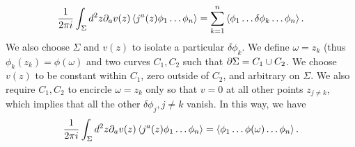 \begin{equation}
    \frac{1}{2\pi i} \int_\Sigma d^2 z \partial_a v(z)\left< j^a(z)\phi_1 \ldots \phi_n \right>=\sum_{k=1}^n \left< \phi_1 \ldots \delta \phi_k \ldots \phi_n \right>.
\end{equation}
We also choose $\Sigma$ and $v(z)$ to isolate a particular $\delta \phi_k$. We define $\omega =z_k$ (thus $\phi_k(z_k)=\phi(\omega)$ and two curves $C_1,C_2$ such that $\partial \Sigma=C_1 \cup C_2$.%
We choose $v(z)$ to be constant within $C_1$, zero outside of $C_2$, and arbitrary on $\Sigma$. We also require $C_1,C_2$ to encircle $\omega =z_k$ only so that $v=0$ at all other points $z_{j\neq k}$, which implies that all the other $\delta \phi_j, j\neq k$ vanish. In this way, we have
\begin{equation}
    \frac{1}{2\pi i}\int_\Sigma d^2 z \partial_a v(z) \left< j^a (z) \phi_1 \ldots \phi_n \right> =\left< \phi_1 \ldots \phi(\omega) \ldots \phi_n \right>.
\end{equation}